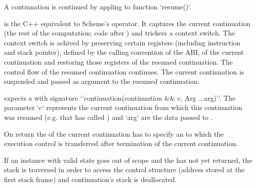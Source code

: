 A contiunation is continued by appling to function `resume()`.



\call is the C++ equivalent to Scheme's \cc operator. It captures the
current continuation (the rest of the computation; code after \call) and
trickers a context switch. The context switch is achived by preserving certain
registers (including instruction and stack pointer), defined by the calling
convention of the ABI, of the current continuation and restoring those
registers of the resumed continuation. The control flow of the resumed
continuation continues.
The current continuation is suspended and passed as argument to the resumed
continuation.

\call expects a \contfn with signature
`'continuation(continuation && c, Arg ...arg)'`. The parameter `c`
represents the current continuation from which this continuation was resumed
(e.g. that has called \call) and `arg` are the data passed to \call.

On return the \contfn of the current continuation has to specify an
\con to which the execution control is transferred after termination
of the current continuation.

If an instance with valid state goes out of scope and the \contfn has
not yet returned, the stack is traversed in order to access the control
structure (address stored at the first stack frame) and continuation's stack is
deallocated.


